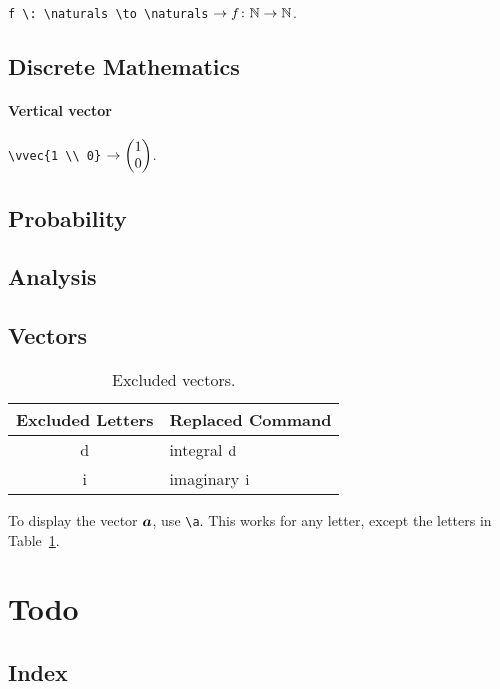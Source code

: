 \documentclass[11pt]{article}
\begin{document}
    \verb|f \: \naturals \to \naturals| $\to f \colon \mathbb{N} \to \mathbb{N}$.


    \subsection{Discrete Mathematics}

    \paragraph{Vertical vector}
    \verb|\vvec{1 \\ 0}| $\to \begin{pmatrix} 1 \\ 0 \end{pmatrix}$.

    \subsection{Probability}

    \subsection{Analysis}

    \subsection{Vectors}
    \begin{table}
        \centering
        \begin{tabular}{cl}
            \toprule
            \textbf{Excluded Letters} & \textbf{Replaced Command} \\
            \midrule
            d & integral $\mathop{}\!\mathrm{d}$ \\
            i & imaginary $\mathrm{i}\mkern1mu$ \\
            \bottomrule
        \end{tabular}
        \caption{Excluded vectors.}
        \label{tab:excluded-vector}
    \end{table}
    To display the vector ${\bm a}$, use \verb|\a|.
    This works for any letter, except the letters in Table~\ref{tab:excluded-vector}.

    \section{Todo}
    \subsection{Index}
\end{document}
